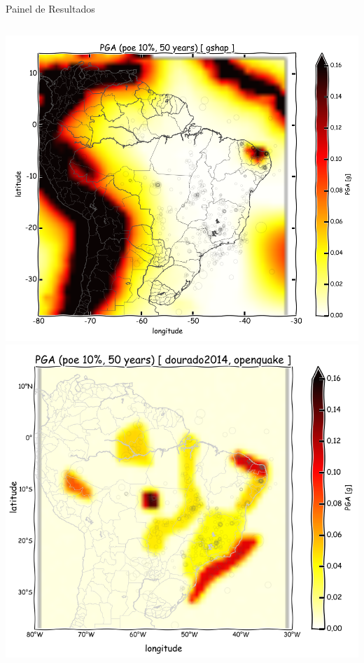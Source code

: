\documentclass[ucs,8pt]{beamer}
\begin{document}
\begin{frame}{Painel de Resultados}

\begin{columns}
	\begin{column}[T]{.24\textwidth}
		\includegraphics[width=1\textwidth]{pga_gshap} \\
		\includegraphics[width=1\textwidth]{pga_dourado_oq}
	\end{column}
	

\end{columns}
\end{frame}
\end{document}
